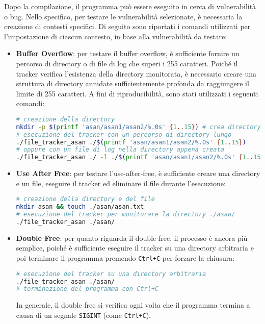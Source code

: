 Dopo la compilazione, il programma può essere eseguito in cerca di vulnerabilità
o bug. Nello specifico, per testare le vulnerabilità selezionate, è necessaria la
creazione di contesti specifici. Di seguito sono riportati i comandi utilizzati
per l'impostazione di ciascun contesto, in base alla vulnerabilità da testare:
\begin{itemize}
  \item \textbf{Buffer Overflow}: per testare il buffer overflow, è sufficiente
    fornire un percorso di directory o di file di log che superi i 255 caratteri.
    Poiché il tracker verifica l'esistenza della directory monitorata, è
    necessario creare una struttura di directory annidate sufficientemente
    profonda da raggiungere il limite di 255 caratteri. A fini di riproducibilità,
    sono stati utilizzati i seguenti comandi: \begin{lstlisting}[language=bash, numbers=none]
# creazione della directory
mkdir -p $(printf 'asan/asan1/asan2/%.0s' {1..15}) # crea directory annidate
# esecuzione del tracker con un percorso di directory lungo
./file_tracker_asan ./$(printf 'asan/asan1/asan2/%.0s' {1..15})
# oppure con un file di log nella directory appena creata
./file_tracker_asan ./ -l ./$(printf 'asan/asan1/asan2/%.0s' {1..15})logfile.log
    \end{lstlisting}

  \item \textbf{Use After Free}: per testare l'use-after-free, è sufficiente
    creare una directory e un file, eseguire il tracker ed eliminare il file durante
    l'esecuzione:
    \begin{lstlisting}[language=bash, numbers=none]
# creazione della directory e del file
mkdir asan && touch ./asan/asan.txt
# esecuzione del tracker per monitorare la directory ./asan/
./file_tracker_asan ./asan/
    \end{lstlisting}

  \item \textbf{Double Free}: per quanto riguarda il double free, il processo è
    ancora più semplice, poiché è sufficiente eseguire il tracker su una directory
    arbitraria e poi terminare il programma premendo \texttt{Ctrl+C} per forzare
    la chiusura: \begin{lstlisting}[language=bash, numbers=none]
# esecuzione del tracker su una directory arbitraria
./file_tracker_asan ./asan/
# terminazione del programma con Ctrl+C
    \end{lstlisting}
    In generale, il double free si verifica ogni volta che il programma termina
    a causa di un segnale \texttt{SIGINT} (come \texttt{Ctrl+C}).
\end{itemize}

